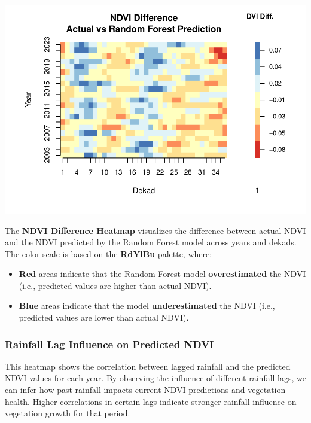 \documentclass[
]{article}
\providecommand{\tightlist}{%
  \setlength{\itemsep}{0pt}\setlength{\parskip}{0pt}}
\begin{document}
\begin{center}\includegraphics{BI_VegetationResponse_Project_HarvardX_Ph125_9x_files/figure-latex/vis_prediction_error_heatmap-1} \end{center}

The \textbf{NDVI Difference Heatmap} visualizes the difference between
actual NDVI and the NDVI predicted by the Random Forest model across
years and dekads. The color scale is based on the \textbf{RdYlBu}
palette, where:

\begin{itemize}
\tightlist
\item
  \textbf{Red} areas indicate that the Random Forest model
  \textbf{overestimated} the NDVI (i.e., predicted values are higher
  than actual NDVI).
\item
  \textbf{Blue} areas indicate that the model \textbf{underestimated}
  the NDVI (i.e., predicted values are lower than actual NDVI).
\end{itemize}

\subsubsection{Rainfall Lag Influence on Predicted
NDVI}\label{rainfall-lag-influence-on-predicted-ndvi}

This heatmap shows the correlation between lagged rainfall and the
predicted NDVI values for each year. By observing the influence of
different rainfall lags, we can infer how past rainfall impacts current
NDVI predictions and vegetation health. Higher correlations in certain
lags indicate stronger rainfall influence on vegetation growth for that
period.
\end{document}
